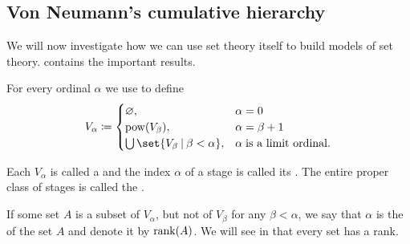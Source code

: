 \subsection{Von Neumann's cumulative hierarchy}\label{subsec:von_neumanns_cumulative_hierarchy}

We will now investigate how we can use set theory itself to build models of set theory.  contains the important results.

\begin{definition}\label{def:cumulative_hierarchy}
  For every ordinal \( \alpha \) we use  to define
  \begin{equation}\label{eq:def:cumulative_hierarchy}
    V_\alpha \coloneqq \begin{cases}
      \varnothing,                                  &\alpha = 0 \\
      \pow(V_\beta),                                &\alpha = \beta + 1 \\
      \bigcup\set{ V_\beta \given \beta < \alpha }, &\alpha \T{is a limit ordinal.}
    \end{cases}
  \end{equation}

  Each \( V_\alpha \) is called a  and the index \( \alpha \) of a stage is called its . The entire proper class of stages is called the .

  If some set \( A \) is a subset of \( V_\alpha \), but not of \( V_\beta \) for any \( \beta < \alpha \), we say that \( \alpha \) is the  of the set \( A \) and denote it by \( \operatorname{rank}(A) \). We will see in  that every set has a rank.
\end{definition}

